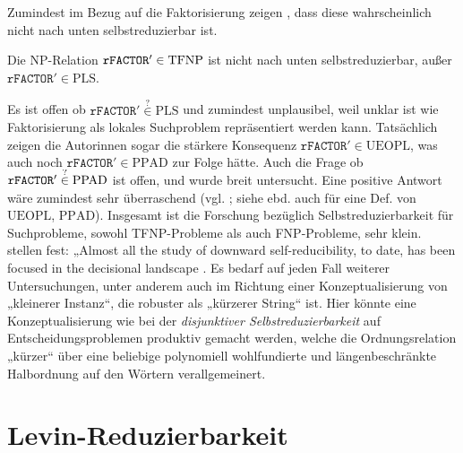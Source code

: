 Zumindest im Bezug auf die Faktorisierung zeigen \citeauthor{harsha_downward_2023}, dass diese wahrscheinlich nicht nach unten selbstreduzierbar ist.
\begin{theorem}
    Die NP-Relation $\mathtt{rFACTOR}'\in\mathrm{TFNP}$ ist nicht nach unten selbstreduzierbar, außer $\mathtt{rFACTOR}'\in\mathrm{PLS}$.
\end{theorem}
Es ist offen ob $\mathtt{rFACTOR}'\stackrel{?}{\in}\mathrm{PLS}$ und zumindest unplausibel, weil unklar ist wie Faktorisierung als lokales Suchproblem repräsentiert werden kann.
Tatsächlich zeigen die Autorinnen sogar die stärkere Konsequenz $\mathtt{rFACTOR}'\in\mathrm{UEOPL}$, was auch noch $\mathtt{rFACTOR}'\in\mathrm{PPAD}$ zur Folge hätte. Auch die Frage ob $\mathtt{rFACTOR}'\stackrel{\smash ?}{\in}\mathrm{PPAD}$ ist offen, und wurde breit untersucht. Eine positive Antwort wäre zumindest sehr überraschend (vgl. \cite[67:15]{harsha_downward_2023}; siehe ebd. auch für eine Def. von $\mathrm{UEOPL}$, $\mathrm{PPAD}$).\label{page:self-reducibility}
Insgesamt ist die Forschung bezüglich Selbstreduzierbarkeit für Suchprobleme, sowohl TFNP-Probleme als auch FNP-Probleme, sehr klein. \citeauthor{harsha_downward_2023} stellen fest: „\foreignlanguage{english}{Almost all the study of downward self-reducibility, to date, has been focused in the decisional landscape} \textcite*{harsha_downward_2023}. 
Es bedarf auf jeden Fall weiterer Untersuchungen, unter anderem auch im Richtung einer Konzeptualisierung von „kleinerer Instanz“, die robuster als „kürzerer String“ ist. Hier könnte eine Konzeptualisierung wie bei der \emph{disjunktiver Selbstreduzierbarkeit} auf Entscheidungsproblemen \parencites(vgl.)(){meyer_frequency_1979}{balcazar_self_1989}{selman_natural_1988}[Abschn. 9.5]{wechsung_vorlesungen_2000} produktiv gemacht werden, welche die Ordnungsrelation „kürzer“ über eine beliebige polynomiell wohlfundierte und längenbeschränkte Halbordnung auf den Wörtern verallgemeinert.

\section{Levin-Reduzierbarkeit}\label{sec:levin}

